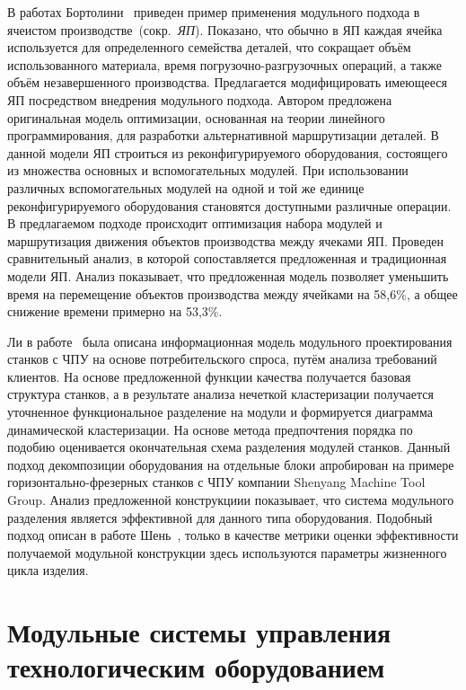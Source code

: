 В работах Бортолини~\cite{bortolini2019reconfigurability, bortolini2019dynamic} приведен пример применения модульного подхода в ячеистом производстве~(сокр.~\textit{ЯП}). Показано, что обычно в ЯП каждая ячейка используется для определенного семейства деталей, что сокращает объём использованного материала, время погрузочно-разгрузочных операций, а также объём незавершенного производства. Предлагается модифицировать имеющееся ЯП посредством внедрения модульного подхода. Автором предложена оригинальная модель оптимизации, основанная на теории линейного программирования, для разработки альтернативной маршрутизации деталей. В данной модели ЯП строиться из реконфигурируемого оборудования, состоящего из множества основных и вспомогательных модулей. При использовании различных вспомогательных модулей на одной и той же единице реконфигурируемого оборудования становятся доступными различные операции. В предлагаемом подходе происходит оптимизация набора модулей и маршрутизация движения объектов производства между ячеками ЯП. Проведен сравнительный анализ, в которой сопоставляется предложенная и традиционная модели ЯП. Анализ показывает, что предложенная модель позволяет уменьшить время на перемещение объектов производства между ячейками на 58,6\%, а общее снижение времени примерно на 53,3\%.

Ли в работе~\cite{li2020modular} была описана информационная модель модульного проектирования станков с ЧПУ на основе  потребительского спроса, путём анализа требований клиентов. На основе предложенной функции качества получается базовая структура станков, а в результате анализа нечеткой кластеризации получается уточненное функциональное разделение на модули и формируется диаграмма динамической кластеризации. На основе метода предпочтения порядка по подобию оценивается окончательная схема разделения модулей станков. Данный подход декомпозиции оборудования на отдельные блоки апробирован на примере горизонтально-фрезерных станков с ЧПУ компании Shenyang Machine Tool Group. Анализ предложенной конструкциии показывает, что система модульного разделения является эффективной для данного типа оборудования. Подобный подход описан в работе Шень~\cite{sheng2017lifecycle}, только в качестве метрики оценки эффективности получаемой модульной конструкции здесь используются параметры жизненного цикла изделия.  

\section{Модульные системы управления технологическим оборудованием}\label{sec:ch1/sec2}

